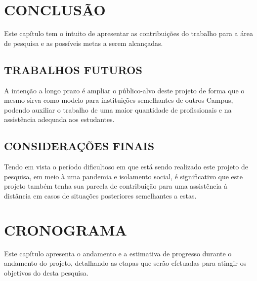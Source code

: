 
\chapter{CONCLUSÃO}
\label{chap:conclusao}

Este capítulo tem o intuito de apresentar as contribuições do trabalho para a área de pesquisa e as possíveis metas a serem alcançadas.

\section{TRABALHOS FUTUROS}
\label{sec:trabalhosFuturos}

A intenção a longo prazo é ampliar o público-alvo deste projeto de forma que o mesmo sirva como modelo para instituições semelhantes de outros Campus, podendo auxiliar o trabalho de uma maior quantidade de profissionais e na assistência adequada aos estudantes. 

\section{CONSIDERAÇÕES FINAIS}
\label{sec:consideracoesFinais}
Tendo em vista o período dificultoso em que está sendo realizado este projeto de pesquisa, em meio à uma pandemia e isolamento social, é significativo que este projeto também tenha sua parcela de contribuição para uma assistência à distância em casos de situações posteriores semelhantes a estas. 


\chapter{CRONOGRAMA}
\label{chap:cronograma}

Este capítulo apresenta o andamento e a estimativa de progresso durante o andamento do projeto, detalhando as etapas que serão efetuadas para atingir os objetivos do desta pesquisa.

